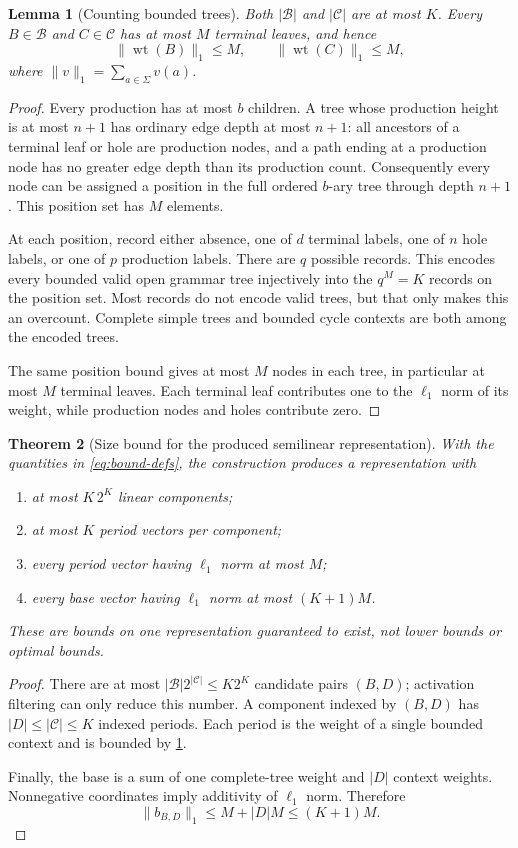 \documentclass[11pt,a4paper]{article}
\numberwithin{equation}{section}
\theoremstyle{plain}
\newtheorem{theorem}{Theorem}[section]
\newtheorem{lemma}[theorem]{Lemma}
\theoremstyle{definition}
\theoremstyle{remark}
\newcommand{\wt}{\operatorname{wt}}
\newcommand{\Bases}{\mathcal B}
\newcommand{\Cycles}{\mathcal C}
\begin{document}
\begin{lemma}[Counting bounded trees]\label{lem:count-trees}
Both $|\Bases|$ and $|\Cycles|$ are at most $K$. Every $B\in\Bases$ and $C\in\Cycles$ has at most $M$ terminal leaves, and hence
\[
\|\wt(B)\|_1\leq M,\qquad \|\wt(C)\|_1\leq M,
\]
where $\|v\|_1=\sum_{a\in\Sigma}v(a)$.
\end{lemma}
\begin{proof}
Every production has at most $b$ children. A tree whose production height is at most $n+1$ has ordinary edge depth at most $n+1$: all ancestors of a terminal leaf or hole are production nodes, and a path ending at a production node has no greater edge depth than its production count. Consequently every node can be assigned a position in the full ordered $b$-ary tree through depth $n+1$. This position set has $M$ elements.

At each position, record either absence, one of $d$ terminal labels, one of $n$ hole labels, or one of $p$ production labels. There are $q$ possible records. This encodes every bounded valid open grammar tree injectively into the $q^M=K$ records on the position set. Most records do not encode valid trees, but that only makes this an overcount. Complete simple trees and bounded cycle contexts are both among the encoded trees.

The same position bound gives at most $M$ nodes in each tree, in particular at most $M$ terminal leaves. Each terminal leaf contributes one to the $\ell_1$ norm of its weight, while production nodes and holes contribute zero.
\end{proof}

\begin{theorem}[Size bound for the produced semilinear representation]\label{thm:size-bound}
With the quantities in \eqref{eq:bound-defs}, the construction produces a representation with
\begin{enumerate}[label=(\roman*)]
\item at most $K\,2^K$ linear components;
\item at most $K$ period vectors per component;
\item every period vector having $\ell_1$ norm at most $M$;
\item every base vector having $\ell_1$ norm at most $(K+1)M$.
\end{enumerate}
These are bounds on one representation guaranteed to exist, not lower bounds or optimal bounds.
\end{theorem}
\begin{proof}
There are at most $|\Bases|2^{|\Cycles|}\leq K2^K$ candidate pairs $(B,D)$; activation filtering can only reduce this number. A component indexed by $(B,D)$ has $|D|\leq|\Cycles|\leq K$ indexed periods. Each period is the weight of a single bounded context and is bounded by \cref{lem:count-trees}.

Finally, the base is a sum of one complete-tree weight and $|D|$ context weights. Nonnegative coordinates imply additivity of $\ell_1$ norm. Therefore
\[
\|b_{B,D}\|_1
\leq M+|D|M\leq(K+1)M.
\]
\end{proof}
\end{document}

